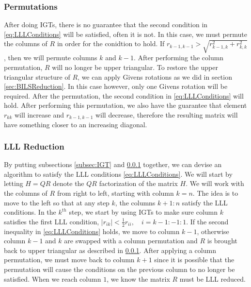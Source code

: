 \documentclass[12pt,Bold,letterpaper]{mcgilletdclass}
\begin{document}
\subsubsection{Permutations} \label{subsec:Perm}
After doing IGTs, there is no guarantee that the second condition in \eqref{eq:LLLConditions} will be satisfied, often it is not. In this case, we must permute the columns of $R$ in order for the conidtion to hold. If $r_{k-1,k-1} > \sqrt{r^2_{k-1,k} + r^2_{k,k}}$, then we will permute columns $k$ and $k-1$. After performing the column permutation, $R$ will no longer be upper triangular. To restore the upper triangular structure of $R$, we can apply Givens rotations as we did in section \ref{sec:BILSReduction}. In this case however, only one Givens rotation will be required.
After the permutation, the second condition in \eqref{eq:LLLConditions} will hold. After performing this permutation, we also have the guarantee that element $r_{kk}$ will increase and $r_{k-1,k-1}$ will decrease, therefore the resulting matrix will have something closer to an increasing diagonal.

\subsubsection{LLL Reduction}
By putting subsections \ref{subsec:IGT} and \ref{subsec:Perm} together, we can devise an algorithm to satisfy the LLL conditions \eqref{eq:LLLConditions}. We will start by letting $H = QR$ denote the $QR$ factorization of the matrix $H$. We will work with the columns of $R$ from right to left, starting with column $k=n$. The idea is to move to the left so that at any step $k$, the columns $k+1:n$ satisfy the LLL conditions. In the $k^{th}$ step, we start by using IGTs to make sure column $k$ satisfies the first LLL condition, $|r_{ik}| < \frac{1}{2}r_{ii}, \quad i = k-1:-1:1$. If the second inequality in \ref{eq:LLLConditions} holds, we move to column $k-1$, otherwise column $k-1$ and $k$ are swapped with a column permutation and $R$ is brought back to upper triangular as described in \ref{subsec:Perm}. After applying a column permutation, we must move back to column $k+1$ since it is possible that the permutation will cause the conditions on the previous column to no longer be satisfied. When we reach column $1$, we know the matrix $R$ must be LLL reduced.
\end{document}
